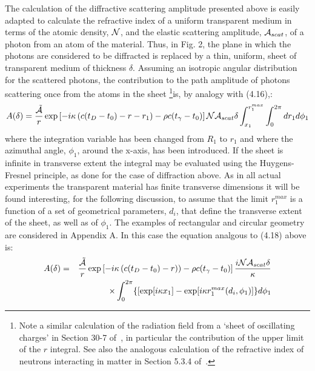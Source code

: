 \documentclass [12pt]{article}
\begin{document}
{  \par The calculation of the diffractive scattering amplitude presented above is easily adapted
   to calculate the refractive index of a uniform transparent medium in terms of the atomic
   density, ${\cal N}$, and the elastic scattering amplitude, ${\cal A}_ {scat}$, of a photon from
    an atom of the 
   material. Thus, in Fig. 2, the plane in which the photons are considered to be diffracted is 
   replaced by a thin, uniform, sheet of transparent medium of thickness $\delta$. Assuming an
   isotropic angular distribution for the scattered photons, the contribution to the path amplitude
    of photons scattering once from the atoms in the sheet
    \footnote{Note a similar calculation of the radiation field from a `sheet of oscillating
     charges' in Section 30-7 of~\cite{Feyn2}, in particular the contribution of the upper
    limit of the $r$ integral. See also the analogous calculation of the refractive index of neutrons
 interacting in matter in Section 5.3.4 of~\cite{LLFB}.}is, by analogy with (4.16),:
   \begin{equation}
  A(\delta) =  \frac{\tilde{{\cal A}}}{r}\exp\left[ - i \kappa \left(c(t_D-t_0)- r - r_1
   \right)-\rho c(t_{\gamma}-t_0)\right] {\cal N} {\cal A}_{scat} \delta
    \int_{x_1}^{r_1^{max}} \int_0^{2 \pi}  d r_1  d\phi_1
\end{equation}
   where the integration variable has been changed from $R_1$ to $r_1$ and where the azimuthal
   angle, $\phi_1$, around the x-axis, has been introduced. If the sheet is infinite in 
   transverse extent the integral may be evaluated using the Huygens-Fresnel principle, as done
   for the case of diffraction above. As in all actual experiments the transparent material
   has finite transverse dimensions it will be found interesting, for the following discussion,
   to assume that the limit $r_1^{max}$ is a function of a set of geometrical parameters, $d_i$,
   that define the transverse extent of the sheet, as well as of $\phi_1$. The examples of
   rectangular and circular geometry are considered in Appendix A. In this case the equation
   analgous to (4.18) above is:
   \begin{eqnarray}
 A(\delta) & = & \frac{\tilde{{\cal A}}}{r}\exp\left[ - i\kappa \left(c(t_D-t_0)- r)
   \right)-\rho c (t_{\gamma}-t_0)\right]\frac{i{\cal N} {\cal A}_{scat} \delta}{\kappa} \nonumber \\ 
      &   & \times \int_0^{2 \pi}\{ \left[ \exp[i \kappa x_1]- \exp[i\kappa
    r_1^{max}(d_i,\phi_1) \right]\} d\phi_1  \nonumber \\

\end{eqnarray}}
\end{document}

